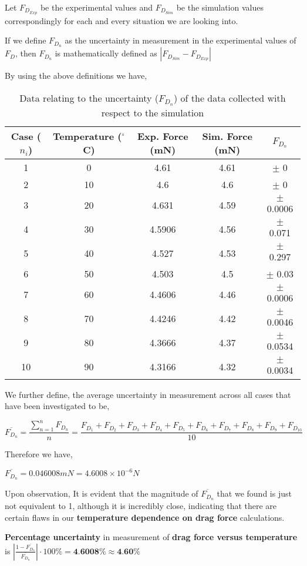{Let $F_{{D}_{Exp}}$ be the experimental values and $F_{{D}_{Sim}}$ be the simulation values correspondingly for each and every situation we are looking into.} 

{If we define $F_{D_n}$ as the uncertainty in measurement in the experimental values of $F_D$, then $F_{D_n}$ is mathematically defined as $\left| F_{{D}_{Sim}} - F_{{D}_{Exp}} \right|$}

{By using the above definitions we have,}

\begin{table}[H]
  \centering
  \caption{Data relating to the uncertainty ($F_{D_{n}}$) of the data collected with respect to the simulation}
    \begin{tabular}{ccccc}
    \hline
    \hline
    Case ($n_{i}$)  & Temperature ($^\circ$C)  & Exp. Force (mN) & Sim. Force (mN) & $F_{D_n}$ \\
    \hline
    \hline
    1     & 0     & 4.61  & 4.61  & $\pm$ 0 \\
    \midrule
    2     & 10    & 4.6   & 4.6   & $\pm$ 0 \\
    \midrule
    3     & 20    & 4.631 & 4.59  & $\pm$ 0.0006 \\
    \midrule
    4     & 30    & 4.5906 & 4.56  & $\pm$ 0.071 \\
    \midrule
    5     & 40    & 4.527 & 4.53  & $\pm$ 0.297 \\
    \midrule
    6     & 50    & 4.503 & 4.5   & $\pm$ 0.03 \\
    \midrule
    7     & 60    & 4.4606 & 4.46  & $\pm$ 0.0006 \\
    \midrule
    8     & 70    & 4.4246 & 4.42  & $\pm$ 0.0046 \\
    \midrule
    9     & 80    & 4.3666 & 4.37  & $\pm$ 0.0534 \\
    \midrule
    10    & 90    & 4.3166 & 4.32  & $\pm$ 0.0034 \\
    \hline
    \hline
    \end{tabular}%
  \label{tab:addlabel}%
\end{table}%

{We further define, the average uncertainty in measurement across all cases that have been investigated to be,} 

    $$\overline{F_{D_n}} = \frac{\sum_{n=1}^{n}F_{D_n}}{n} = \frac{F_{D_1} + F_{D_2} + F_{D_3} + F_{D_4} + F_{D_5} + F_{D_6} + F_{D_7} + F_{D_8} + F_{D_9} + F_{D_{10}}}{10}$$

{Therefore we have,}

    $\overline{F_{D_n}} = 0.046008 mN = 4.6008\times 10^{-6} N$

{Upon observation, It is evident that the magnitude of $\overline{F_{D_n}}$ that we found is just not equivalent to 1, although it is incredibly close, indicating that there are certain flaws in our \textbf{temperature dependence on drag force} calculations.}
        
        {\textbf{Percentage uncertainty} in measurement of \textbf{drag force versus temperature} is $\left|\frac{1-\overline{F_{D_n}}}{\overline{F_{D_n}}}\right|\cdot{100\%} = \textbf{4.6008\%} \approx \textbf{4.60\%}$}
        



